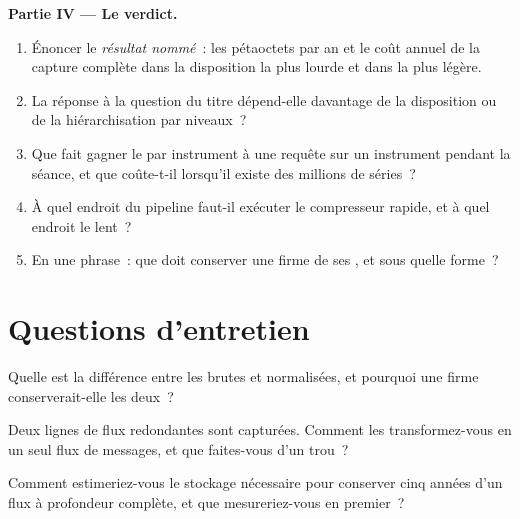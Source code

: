 \begin{problem}
\medskip\noindent\textbf{Partie IV --- Le verdict.}
\begin{enumerate}[resume]
\item Énoncer le \emph{résultat nommé}~: les pétaoctets par an et le coût annuel de la capture complète dans la disposition la plus lourde et dans la plus
légère.
\item La réponse à la question du titre dépend-elle davantage de la disposition ou de la hiérarchisation par niveaux~?
\item Que fait gagner le  par instrument à une requête sur un instrument pendant la séance, et que coûte-t-il
lorsqu'il existe des millions de séries~?
\item À quel endroit du pipeline faut-il exécuter le compresseur rapide, et à quel endroit le lent~?
\item En une phrase~: que doit conserver une firme de ses , et sous quelle forme~?
\end{enumerate}
\end{problem}

\section{Questions d'entretien}

\begin{interviewq}\label{iq:pl:capturing-and-storing-tick-data:1}
Quelle est la différence entre les  brutes et normalisées, et pourquoi une firme conserverait-elle les deux~?
\end{interviewq}

\begin{interviewq}\label{iq:pl:capturing-and-storing-tick-data:2}
Deux lignes de flux redondantes sont capturées. Comment les transformez-vous en un seul flux de messages, et que faites-vous d'un trou~?
\end{interviewq}

\begin{interviewq}\label{iq:pl:capturing-and-storing-tick-data:3}
Comment estimeriez-vous le stockage nécessaire pour conserver cinq années d'un flux à profondeur complète, et que mesureriez-vous en premier~?
\end{interviewq}

